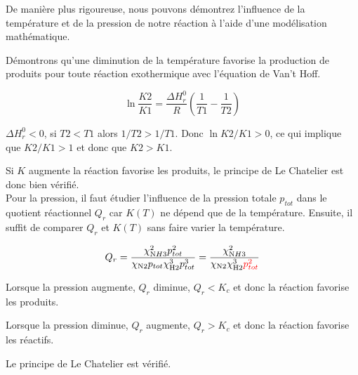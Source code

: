 \documentclass[10pt,a4paper]{article}
\begin{document}
De manière plus rigoureuse, nous pouvons démontrez l'influence de la température et de la pression de notre réaction à l'aide d'une modélisation mathématique.

Démontrons qu'une diminution de la température favorise la production de produits pour toute réaction exothermique avec l'équation de Van't Hoff.

$$\ln{\frac{K2}{K1}} = \frac{\Delta H^0_r}{R}(\frac{1}{T1} - \frac{1}{T2}) $$ 

$ \Delta H^0_r < 0$, si $T2<T1$ alors $1/T2 > 1/T1$. Donc $\ln{K2/K1} > 0$, ce qui implique que $K2/K1>1$  et donc que $ K2>K1$.

Si $K$ augmente la réaction favorise les produits, le principe de Le Chatelier est donc bien vérifié.
\\

Pour la pression, il faut étudier l'influence de la pression totale $p_{tot}$ dans le quotient réactionnel $Q_r$ car $K(T)$ ne dépend que de la température. Ensuite, il suffit de comparer $Q_r$ et  $K(T)$ sans faire varier la température. 

$$ Q_r= \frac{\chi_{\ce NH3}^2 p_{tot}^2}{\chi_{\ce N2} p_{tot} \chi_{\ce H2}^3 p_{tot}^3}=\frac{\chi_{\ce NH3}^2}{\chi_{\ce N2} \chi_{\ce H2}^3 \textcolor{red}{p_{tot}^2}}$$ 

Lorsque la pression augmente, $Q_r$ diminue, $Q_r < K_c$ et donc la réaction favorise les produits.
 
Lorsque la pression diminue, $Q_r$ augmente, $Q_r > K_c$ et donc la réaction favorise les réactifs.

Le principe de Le Chatelier est vérifié.


 
\end{document}
